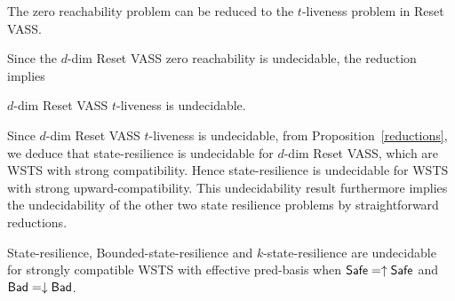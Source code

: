\begin{theorem}\label{liveness reset}
The  zero reachability problem can be reduced to the $t$-liveness problem in Reset VASS.
\end{theorem}

\iffalse
\begin{proof}
See Appendix~\ref{appendix} for the complete proof.
\end{proof}
\fi

Since the {$d$-dim Reset VASS zero reachability} is undecidable, the reduction implies 
%
\iffalse
\begin{corollary}
Liveness is undecidable in Reset VASS.
\end{corollary}

Since moreover liveness can be reduced to 
$t$-liveness, we deduce:
\fi
%
{$d$-dim Reset VASS $t$-liveness} is undecidable.





Since {$d$-dim Reset VASS $t$-liveness} is undecidable, from Proposition~\ref{reductions},  we deduce that {\sc state-resilience} is undecidable  for $d$-dim Reset VASS, which are WSTS with strong compatibility. Hence {\sc state-resilience} is undecidable  for WSTS with strong upward-compatibility. This undecidability result furthermore implies the undecidability of the other two state resilience problems by straightforward reductions.


\begin{theorem}\label{srp up down}
{\sc State-resilience},
{\sc Bounded-state-resilience} and
{\sc $k$-state-resilience}
are undecidable for strongly compatible WSTS with effective pred-basis
when
$\textsf{Safe}=\uparrow \textsf{Safe}$
and $\textsf{Bad}=\downarrow \textsf{Bad}$.
\end{theorem}


